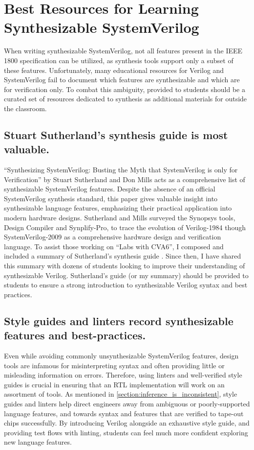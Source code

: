 
\chapter{Best Resources for Learning Synthesizable SystemVerilog}
\label{chapter:resources}

When writing synthesizable SystemVerilog, not all features present in the IEEE 1800 specification can be utilized, as synthesis tools support only a subset of these features. Unfortunately, many educational resources for Verilog and SystemVerilog fail to document which features are synthesizable and which are for verification only. To combat this ambiguity, provided to students should be a curated set of resources dedicated to synthesis as additional materials for outside the classroom.

\section{Stuart Sutherland's synthesis guide is most valuable.}

\enquote{Synthesizing SystemVerilog: Busting the Myth that SystemVerilog is only for Verification} by Stuart Sutherland and Don Mills acts as a comprehensive list of synthesizable SystemVerilog features. Despite the absence of an official SystemVerilog synthesis standard, this paper gives valuable insight into synthesizable language features, emphasizing their practical application into modern hardware designs. Sutherland and Mills surveyed the Synopsys tools, Design Compiler and Synplify-Pro, to trace the evolution of Verilog-1984 though SystemVerilog-2009 as a comprehensive hardware design and verification language. To assist those working on \enquote{Labs with CVA6}, I composed and included a summary of Sutherland's synthesis guide \cite{labsWithCVA6}. Since then, I have shared this summary with dozens of students looking to improve their understanding of synthesizable Verilog. Sutherland's guide (or my summary) should be provided to students to ensure a strong introduction to synthesizable Verilog syntax and best practices.

\section{Style guides and linters record synthesizable features and best-practices.}
\label{section:style_guides}

Even while avoiding commonly unsynthesizable SystemVerilog features, design tools are infamous for misinterpreting syntax and often providing little or misleading information on errors. Therefore, using linters and well-verified style guides is crucial in ensuring that an RTL implementation will work on an assortment of tools. As mentioned in \autoref{section:inference_is_inconsistent}, style guides and linters help direct engineers away from ambiguous or poorly-supported language features, and towards syntax and features that are verified to tape-out chips successfully. By introducing Verilog alongside an exhaustive style guide, and providing test flows with linting, students can feel much more confident exploring new language features.


